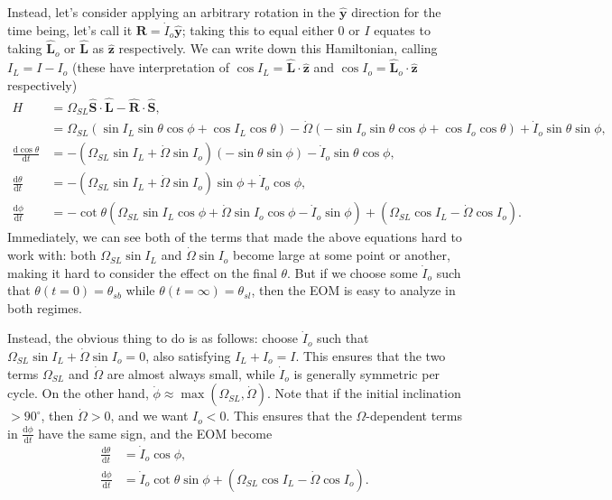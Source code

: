 \documentclass[11pt,
        usenames, %
        dvipsnames %
    ]{article}
\newcommand*{\rd}[2]{\frac{\mathrm{d}#1}{\mathrm{d}#2}}
\newcommand*{\bm}[1]{\boldsymbol{\mathbf{#1}}}
\newcommand*{\uv}[1]{\hat{\bm{#1}}}
\newcommand*{\p}[1]{\left(#1\right)}
\begin{document}
Instead, let's consider applying an arbitrary rotation in the $\uv{y}$
direction for the time being, let's call it $\bm{R} = \dot{I}_o \uv{y}$; taking
this to equal either $0$ or $I$ equates to taking $\uv{L}_o$ or $\uv{L}$ as
$\uv{z}$ respectively. We can write down this Hamiltonian, calling $I_L = I -
I_o$ (these have interpretation of $\cos I_L = \uv{L} \cdot \uv{z}$ and $\cos
I_o = \uv{L}_o \cdot \uv{z}$ respectively)
\begin{align}
    H &= \Omega_{SL} \uv{S} \cdot \uv{L} - \uv{R} \cdot \uv{S},\\
        &= \Omega_{SL}\p{\sin I_L \sin \theta \cos \phi
            + \cos I_L \cos \theta}
            - \dot{\Omega}\p{-\sin I_{o} \sin \theta \cos \phi
                + \cos I_o \cos \theta}
            + \dot{I}_o \sin \theta \sin \phi,\\
    \rd{\cos \theta}{t}
        &= -\p{\Omega_{SL} \sin I_L + \dot{\Omega} \sin I_o}\p{-\sin \theta \sin
            \phi}
            - \dot{I}_o \sin \theta \cos \phi,\\
    \rd{\theta}{t}
        &= -\p{\Omega_{SL} \sin I_L + \dot{\Omega} \sin I_o}\sin \phi
            + \dot{I}_o \cos \phi,\\
    \rd{\phi}{t}
        &= -\cot \theta\p{\Omega_{SL}\sin I_L \cos \phi
                + \dot{\Omega}\sin I_o \cos \phi
                - \dot{I}_o \sin \phi}
            + \p{\Omega_{SL}\cos I_L - \dot{\Omega}\cos I_o}.
\end{align}
Immediately, we can see both of the terms that made the above equations hard to
work with: both $\Omega_{SL}\sin I_L$ and $\dot{\Omega} \sin I_{o}$ become
large at some point or another, making it hard to consider the effect on the
final $\theta$. But if we choose some $\dot{I}_o$ such that $\theta(t = 0) =
\theta_{sb}$ while $\theta(t = \infty) = \theta_{sl}$, then the EOM is easy to
analyze in both regimes.

Instead, the obvious thing to do is as follows: choose $\dot{I}_o$ such that
$\Omega_{SL} \sin I_L + \dot{\Omega} \sin I_o = 0$, also satisfying $I_L + I_o =
I$. This ensures that the two terms $\Omega_{SL}$ and $\dot{\Omega}$ are almost
always small, while $\dot{I}_o$ is generally symmetric per cycle. On the other
hand, $\dot{\phi} \approx \max\p{\Omega_{SL}, \dot{\Omega}}$. Note that if the
initial inclination $> 90^\circ$, then $\dot{\Omega} > 0$, and we want $I_o <
0$. This ensures that the $\Omega$-dependent terms in $\rd{\phi}{t}$ have the
same sign, and the EOM become
\begin{align}
    \rd{\theta}{t}
        &= \dot{I}_o \cos \phi,\\
    \rd{\phi}{t}
        &= \dot{I}_o \cot \theta \sin \phi
            + \p{\Omega_{SL}\cos I_L - \dot{\Omega}\cos I_o}.
\end{align}
\end{document}

